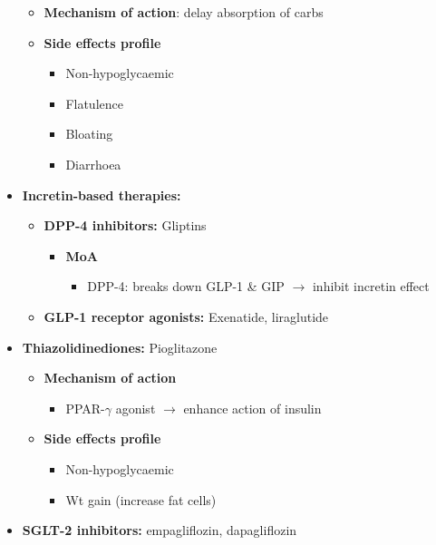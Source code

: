 \documentclass[
  12pt,
]{memoir}
\providecommand{\tightlist}{%
  \setlength{\itemsep}{0pt}\setlength{\parskip}{0pt}}
\begin{document}
\begin{itemize}
  \begin{itemize}
  \tightlist
  \item
    \textbf{Mechanism of action}: delay absorption of carbs
  \item
    \textbf{Side effects profile}

    \begin{itemize}
    \tightlist
    \item
      Non-hypoglycaemic
    \item
      Flatulence
    \item
      Bloating
    \item
      Diarrhoea
    \end{itemize}
  \end{itemize}
\item
  \textbf{Incretin-based therapies:}

  \begin{itemize}
  \tightlist
  \item
    \textbf{DPP-4 inhibitors:} Gliptins

    \begin{itemize}
    \tightlist
    \item
      \textbf{MoA}

      \begin{itemize}
      \tightlist
      \item
        DPP-4: breaks down GLP-1 \& GIP \(\rightarrow\) inhibit incretin
        effect
      \end{itemize}
    \end{itemize}
  \item
    \textbf{GLP-1 receptor agonists:} Exenatide, liraglutide
  \end{itemize}
\item
  \textbf{Thiazolidinediones:} Pioglitazone

  \begin{itemize}
  \tightlist
  \item
    \textbf{Mechanism of action}

    \begin{itemize}
    \tightlist
    \item
      PPAR-\(\gamma\) agonist \(\rightarrow\) enhance action of insulin
    \end{itemize}
  \item
    \textbf{Side effects profile}

    \begin{itemize}
    \tightlist
    \item
      Non-hypoglycaemic
    \item
      Wt gain (increase fat cells)
    \end{itemize}
  \end{itemize}
\item
  \textbf{SGLT-2 inhibitors:} empagliflozin, dapagliflozin


\end{itemize}
\end{document}
